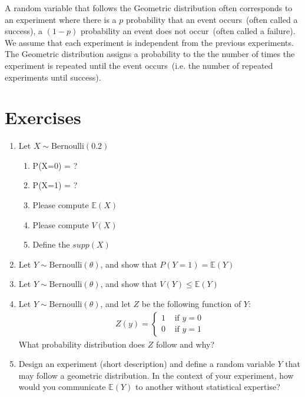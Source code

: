 A random variable that follows the Geometric distribution often corresponds to an experiment where there is a $p$ probability that an event occurs~(often called a success), a $(1-p)$ probability an event does not occur~(often called a failure). 
We assume that each experiment is independent from the previous experiments.
The Geometric distribution assigns a probability to the the number of times the experiment is repeated until the event occurs~(i.e. the number of repeated experiments until success).

\ex 


\section{Exercises}

\begin{enumerate}
    \item Let $X \sim \text{Bernoulli}(0.2)$
    \begin{enumerate}
        \item P(X=0) = ?
        \item P(X=1) = ?
        \item Please compute $\mathbb{E}(X)$
        \item Please compute $V(X)$
        \item Define the $supp(X)$
    \end{enumerate}
    
    \item Let $Y \sim \text{Bernoulli}(\theta)$, and 
    show that $P(Y=1) = \mathbb{E}(Y)$

    \item Let $Y \sim \text{Bernoulli}(\theta)$, and 
    show that $V(Y) \leq \mathbb{E}(Y)$
    
    \item Let $Y \sim \text{Bernoulli}(\theta)$, and let $Z$ be the following function of $Y$:
    \begin{align}
        Z(y) = \begin{cases}
                1 & \text{ if } y = 0\\
                0 & \text{ if } y = 1
            \end{cases}
    \end{align}
    What probability distribution does $Z$ follow and why?
    
    \item Design an experiment (short description) and define a random variable $Y$ that may follow a geometric distribution. In the context of your experiment, how would you communicate $\mathbb{E}(Y)$ to another without statistical expertise?
    
\end{enumerate}



